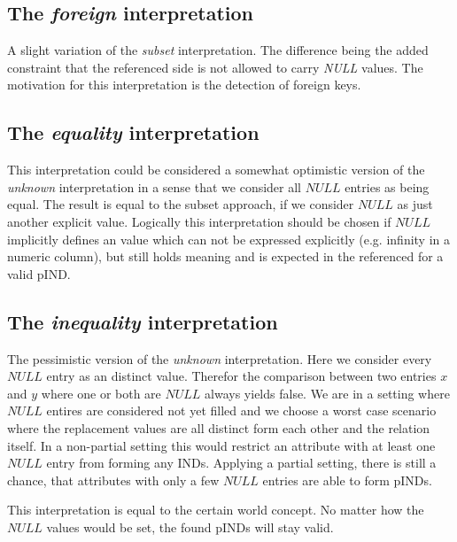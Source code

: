 \subsection*{The \textit{foreign} interpretation}
A slight variation of the \textit{subset} interpretation. The difference being the added constraint that the referenced side is not allowed to
carry \textit{NULL} values. The motivation for this interpretation is the detection of foreign keys.

\subsection*{The \textit{equality} interpretation}
This interpretation could be considered a somewhat optimistic version of the \textit{unknown} interpretation in a sense that we consider all $NULL$ entries as being equal. The result is equal to the subset approach, if we consider $NULL$ as just another explicit value. Logically this interpretation should be chosen if $NULL$ implicitly defines an value which can not be expressed explicitly (e.g. infinity in a numeric column), but still holds meaning and is expected in the referenced for a valid pIND.

\subsection*{The \textit{inequality} interpretation}
The pessimistic version of the \textit{unknown} interpretation. Here we consider every $NULL$ entry as an distinct value. Therefor the comparison between two entries $x$ and $y$ where one or both are $NULL$ always yields false. We are in a setting where $NULL$ entires are considered not yet filled and we choose a worst case scenario where the replacement values are all distinct form each other and the relation itself. In a non-partial setting this would restrict an attribute with at least one $NULL$ entry from forming any INDs. Applying a partial setting, there is still a chance, that attributes with only a few $NULL$ entries are able to form pINDs.

This interpretation is equal to the certain world concept. No matter how the $NULL$ values would be set, the found pINDs will stay valid.

